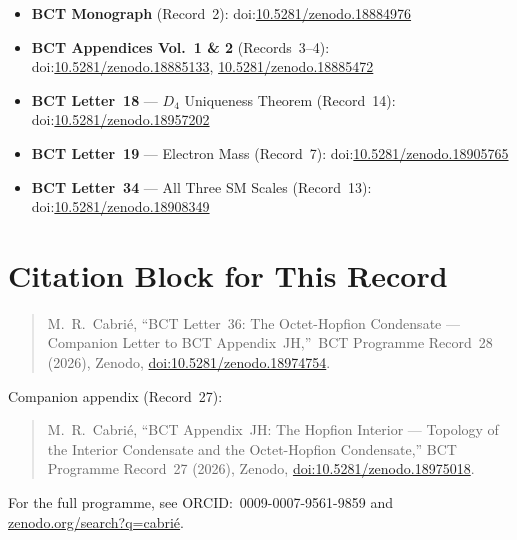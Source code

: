 \documentclass[aps,prl,twocolumn,superscriptaddress,floatfix]{revtex4-2}
\begin{document}
\begin{itemize}
\item \textbf{BCT Monograph} (Record~2):
  doi:\href{https://doi.org/10.5281/zenodo.18884976}{10.5281/zenodo.18884976}

\item \textbf{BCT Appendices Vol.~1 \& 2} (Records~3--4):
  doi:\href{https://doi.org/10.5281/zenodo.18885133}{10.5281/zenodo.18885133},
  \href{https://doi.org/10.5281/zenodo.18885472}{10.5281/zenodo.18885472}

\item \textbf{BCT Letter~18} --- $D_4$ Uniqueness Theorem (Record~14):
  doi:\href{https://doi.org/10.5281/zenodo.18957202}{10.5281/zenodo.18957202}

\item \textbf{BCT Letter~19} --- Electron Mass (Record~7):
  doi:\href{https://doi.org/10.5281/zenodo.18905765}{10.5281/zenodo.18905765}

\item \textbf{BCT Letter~34} --- All Three SM Scales (Record~13):
  doi:\href{https://doi.org/10.5281/zenodo.18908349}{10.5281/zenodo.18908349}
\end{itemize}

\section{Citation Block for This Record}
\label{sec:citation}

\begin{quote}
M.~R.~Cabri\'{e},
``BCT Letter~36: The Octet-Hopfion Condensate ---
Companion Letter to BCT Appendix~JH,''\
BCT Programme Record~28 (2026),
Zenodo, \href{https://doi.org/10.5281/zenodo.18974754}{doi:10.5281/zenodo.18974754}.
\end{quote}

\noindent Companion appendix (Record~27):

\begin{quote}
M.~R.~Cabri\'{e},
``BCT Appendix~JH: The Hopfion Interior ---
Topology of the Interior Condensate and the Octet-Hopfion Condensate,''
BCT Programme Record~27 (2026),
Zenodo, \href{https://doi.org/10.5281/zenodo.18975018}{doi:10.5281/zenodo.18975018}.
\end{quote}

For the full programme, see ORCID:~0009-0007-9561-9859 and
\href{https://zenodo.org/search?q=cabri\%C3\%A9}{zenodo.org/search?q=cabri\'{e}}.
\end{document}
